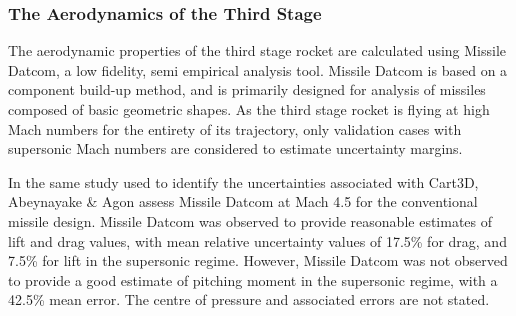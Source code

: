 

\subsubsection{The Aerodynamics of the Third Stage}


The aerodynamic properties of the third stage rocket are calculated using Missile Datcom, a low fidelity, semi empirical analysis tool. Missile Datcom is based on a component build-up method, and is primarily designed for analysis of missiles composed of basic geometric shapes\cite{Abeynayake2013a}. As the third stage rocket is flying at high Mach numbers for the entirety of its trajectory, only validation cases with supersonic Mach numbers are considered to estimate uncertainty margins. 

In the same study used to identify the uncertainties associated with Cart3D, Abeynayake \& Agon assess Missile Datcom at Mach 4.5 for the conventional missile design\cite{Abeynayake2013a}. Missile Datcom was observed to provide reasonable estimates of lift and drag values, with mean relative uncertainty values of 17.5\% for drag, and 7.5\% for lift in the supersonic regime. However, Missile Datcom was not observed to provide a good estimate of pitching moment in the supersonic regime, with a 42.5\% mean error. The centre of pressure and associated errors are not stated. 

